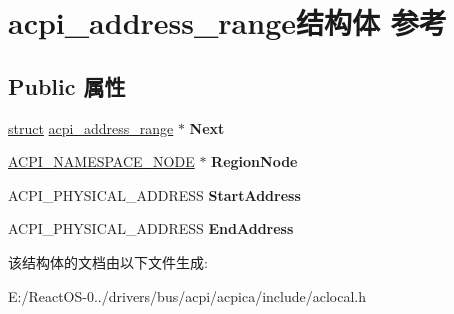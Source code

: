 \hypertarget{structacpi__address__range}{}\section{acpi\+\_\+address\+\_\+range结构体 参考}
\label{structacpi__address__range}
\subsection*{Public 属性}
\begin{DoxyCompactItemize}
\item 
\mbox{\label{structacpi__address__range_a783a21165eb55ca4fb1f20420507986a}} 
\hyperlink{interfacestruct}{struct} \hyperlink{structacpi__address__range}{acpi\+\_\+address\+\_\+range} $\ast$ {\bfseries Next}
\item 
\mbox{\label{structacpi__address__range_afd92cd711e2a80b8e458fa9acd928de9}} 
\hyperlink{structacpi__namespace__node}{A\+C\+P\+I\+\_\+\+N\+A\+M\+E\+S\+P\+A\+C\+E\+\_\+\+N\+O\+DE} $\ast$ {\bfseries Region\+Node}
\item 
\mbox{\label{structacpi__address__range_aedc9db8bc4a570b08a01c534f6064305}} 
A\+C\+P\+I\+\_\+\+P\+H\+Y\+S\+I\+C\+A\+L\+\_\+\+A\+D\+D\+R\+E\+SS {\bfseries Start\+Address}
\item 
\mbox{\label{structacpi__address__range_a08e992935fbee4a178e4f038f4d6af3a}} 
A\+C\+P\+I\+\_\+\+P\+H\+Y\+S\+I\+C\+A\+L\+\_\+\+A\+D\+D\+R\+E\+SS {\bfseries End\+Address}
\end{DoxyCompactItemize}


该结构体的文档由以下文件生成\+:\begin{DoxyCompactItemize}
\item 
E\+:/\+React\+O\+S-\/0../drivers/bus/acpi/acpica/include/aclocal.\+h\end{DoxyCompactItemize}
